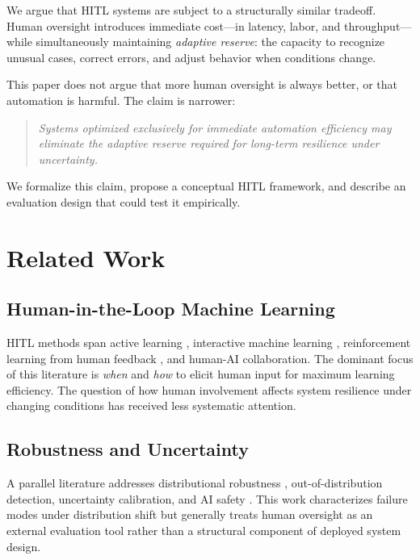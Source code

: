 \documentclass[11pt,a4paper]{article}
\theoremstyle{definition}
\theoremstyle{plain}
\theoremstyle{remark}
\begin{document}
We argue that HITL systems are subject to a structurally similar tradeoff. Human oversight introduces immediate cost---in latency, labor, and throughput---while simultaneously maintaining \emph{adaptive reserve}: the capacity to recognize unusual cases, correct errors, and adjust behavior when conditions change.

This paper does not argue that more human oversight is always better, or that automation is harmful. The claim is narrower:
\begin{quote}
\itshape
Systems optimized exclusively for immediate automation efficiency may eliminate the adaptive reserve required for long-term resilience under uncertainty.
\end{quote}
We formalize this claim, propose a conceptual HITL framework, and describe an evaluation design that could test it empirically.

\section{Related Work}

\subsection{Human-in-the-Loop Machine Learning}

HITL methods span active learning \citep{settles2009}, interactive machine learning \citep{amershi2014}, reinforcement learning from human feedback \citep{christiano2017,ouyang2022}, and human-AI collaboration. The dominant focus of this literature is \emph{when} and \emph{how} to elicit human input for maximum learning efficiency. The question of how human involvement affects system resilience under changing conditions has received less systematic attention.

\subsection{Robustness and Uncertainty}

A parallel literature addresses distributional robustness \citep{hendrycks2017}, out-of-distribution detection, uncertainty calibration, and AI safety \citep{amodei2016}. This work characterizes failure modes under distribution shift but generally treats human oversight as an external evaluation tool rather than a structural component of deployed system design.
\end{document}
